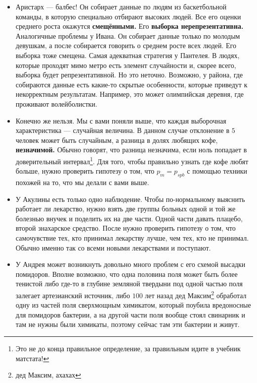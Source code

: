 \documentclass[12pt, a4paper, oneside]{article}
\theoremstyle{plain} %
\theoremstyle{definition}
\newcommand{\indef}[1]{\textbf{ \color{green} #1}}
\begin{document}
\begin{solution}
\begin{itemize}
	\item  Аристарх --- балбес! Он собирает данные по людям из баскетбольной команды, в которую специально отбирают высоких людей. Все его оценки среднего роста окажутся \indef{смещёнными.} Его \indef{выборка нерепрезентативна.}  Аналогичные проблемы у Ивана. Он собирает данные только по молодым девушкам, а после собирается говорить о среднем росте всех людей. Его выборка тоже смещена. Самая адекватная стратегия у Пантелея. В людях, которые проходят мимо метро есть элемент случайности и, скорее всего, выборка будет репрезентативной. Но это неточно. Возможно, у района, где собираются данные есть какие-то скрытые особенности, которые приведут к некорректным результатам. Например, это может олимпийская деревня, где проживают волейболистки.
	
	\item Конечно же нельзя. Мы с вами поняли выше, что каждая выборочная характеристика --- случайная величина. В данном случае отклонение в $5$ человек может быть случайным, а разница в долях любящих кофе, \indef{незначимой.} Обычно говорят, что разница незначима, если ноль попадает в доверительный интервал\footnote{Это не до конца правильное определение, за правильным идите в учебник матстата!}. Для того, чтобы правильно узнать где кофе любят больше, нужно проверить гипотезу о том, что $p_{m} = p_{spb}$ с помощью техники похожей на то, что мы делали с вами выше. 
	
	\item У Акулины есть только одно наблюдение. Чтобы по-нормальному выяснить работает ли лекарство, нужно взять две группы больных одной и той же болезнью внучек и поделить их на две части. Одной части давать плацебо, второй знахарское средство. После нужно проверить гипотезу о том, что самочувствие тех, кто принимал лекарству лучше, чем тех, кто не принимал. Обычно именно так со всеми новыми лекарствами и поступают.
	
	\item У Андрея может возникнуть довольно много проблем с его схемой высадки помидоров. Вполне возможно, что одна половина поля может быть более тенистой либо где-то в глубине земляной твердыни под одной частью поля залегает артезианский источник, либо $100$ лет назад дед Максим\footnote{дед Максим, ахахах} обработал одну из частей поля сверхмощным химикатом, который поубила вредоносные для помидоров бактерии, а на другой части поля вообще стоял свинарник и там не нужны были химикаты, поэтому сейчас там эти бактерии и живут. 
	

\end{itemize}
\end{solution}
\end{document}
